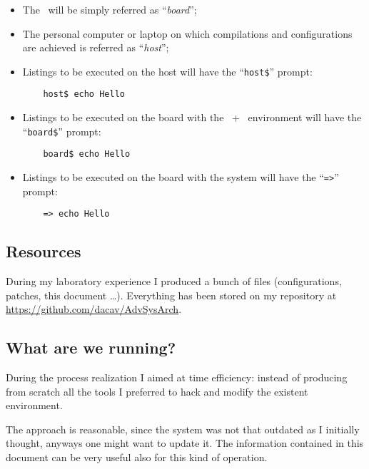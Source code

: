     \begin{itemize}

    \item   The \MyBoard\ will be simply referred as
            ``\emph{board}'';

    \item   The personal computer or laptop on which compilations and
            configurations are achieved is referred as ``\emph{host}'';

    \item   Listings to be executed on the host will have the
            ``\lstinline{host$}'' prompt:
\begin{lstlisting}
    host$ echo Hello
\end{lstlisting}

    \item   Listings to be executed on the board with the
            \BusyBox\ + \Linux\ environment will have the
            ``\lstinline{board$}'' prompt:
\begin{lstlisting}
    board$ echo Hello
\end{lstlisting}

    \item   Listings to be executed on the board with the \uBoot
            system will have the ``\lstinline{=>}'' prompt:
\begin{lstlisting}
    => echo Hello
\end{lstlisting}

    \end{itemize}

\subsection{ Resources } \label{sub:Resources}

    During my laboratory experience I produced a bunch of files
    (configurations, patches, this document \dots). Everything has been
    stored on my  repository at
    \url{https://github.com/dacav/AdvSysArch}.

\subsection{ What are we running? }

    During the process realization I aimed at time efficiency:
    instead of producing from scratch all the tools I preferred to
    hack and modify the existent environment.

    The approach is reasonable, since the system was not that
    outdated as I initially thought, anyways one might want to
    update it. The information contained in this document can be
    very useful also for this kind of operation.

